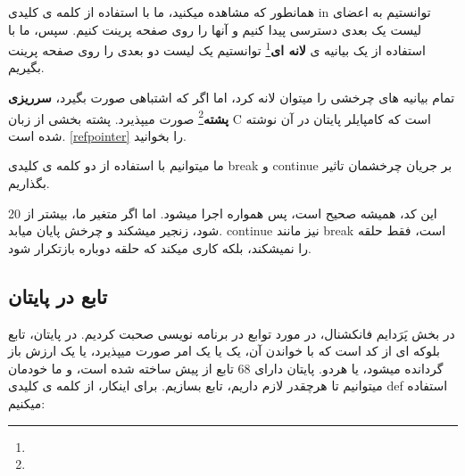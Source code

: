 \documentclass[14pt,a4paper]{memoir}
\begin{document}
	 
	 
	 
	 همانطور که مشاهده میکنید، ما با استفاده از کلمه ی کلیدی in توانستیم به اعضای لیست یک بعدی  دسترسی پیدا کنیم و آنها را روی صفحه پرینت کنیم. سپس، ما با استفاده از یک بیانیه ی \textbf{لانه ای}\footnote{} توانستیم یک لیست دو بعدی را روی صفحه پرینت بگیریم.
	 
	 \begin{tip}
	 	تمام بیانیه های چرخشی را میتوان لانه کرد، اما اگر که اشتباهی صورت بگیرد، \textbf{سرریزی پشته}\footnote{} صورت میپذیرد. پشته بخشی از زبان C است که کامپایلر پایتان در آن نوشته شده است.  \ref*{refpointer} را بخوانید.
	 \end{tip}
	 
	 
	 ما میتوانیم با استفاده از دو کلمه ی کلیدی break و continue بر جریان چرخشمان تاثیر بگذاریم.
	 
	 

		 	 \begin{latin}
			
		\end{latin}

	 
	 
	 این کد، همیشه صحیح است، پس همواره اجرا میشود. اما اگر متغیر ما، بیشتر از 20 شود، زنجیر میشکند و چرخش پایان میابد. continue نیز مانند break است، فقط حلقه را نمیشکند، بلکه کاری میکند که حلقه دوباره بازتکرار شود.
	 
	 
	 
	\subsection{تابع در پایتان}\label{pyfunc}
	در بخش پَرَدایم فانکشنال، در مورد توابع در برنامه نویسی صحبت کردیم. در پایتان، تابع بلوکه ای از کد است که با خواندن آن، یک یا یک امر صورت میپذیرد، یا یک ارزش باز گردانده میشود، یا هردو. پایتان دارای 68 تابع از پیش ساخته شده است، و ما خودمان میتوانیم تا هرچقدر لازم داریم، تابع بسازیم. برای اینکار، از کلمه ی کلیدی def استفاده میکنیم:
	 
	 
	 \begin{latin}
	
\end{latin}
\end{document}
